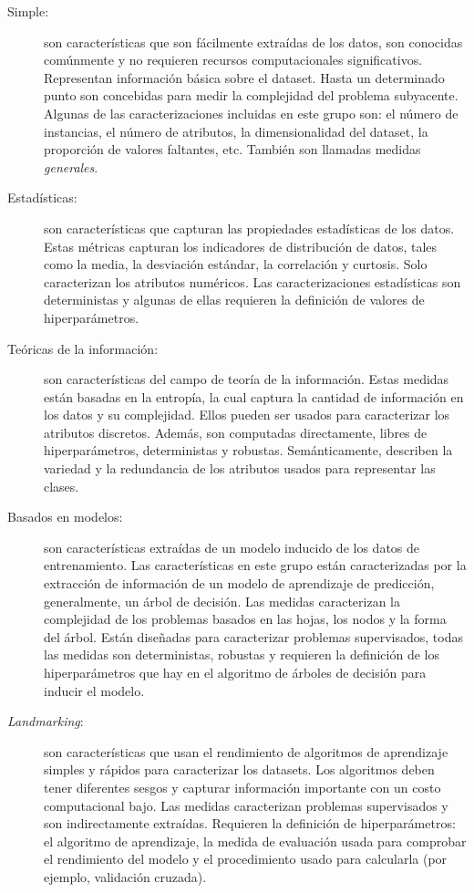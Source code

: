 \begin{description}
	\item[Simple:] son características que son fácilmente extraídas de los datos, son conocidas comúnmente y no requieren recursos computacionales significativos. Representan información básica sobre el dataset. Hasta un determinado punto son concebidas para medir la complejidad del problema subyacente. Algunas de las caracterizaciones incluidas en este grupo son: el número de instancias, el número de atributos, la dimensionalidad del dataset, la proporción de valores faltantes, etc. También son llamadas medidas \textit{generales}.
	
	\item[Estadísticas:] son características que capturan las propiedades estadísticas de los datos. Estas métricas capturan los indicadores de distribución de datos, tales como la media, la desviación estándar, la correlación y curtosis. Solo caracterizan los atributos numéricos. Las caracterizaciones estadísticas son deterministas y algunas de ellas requieren la definición de valores de hiperparámetros. %
	
	\item[Teóricas de la información:] son características del campo de teoría de la información. Estas medidas están basadas en la entropía, la cual captura la cantidad de información en los datos y su complejidad. Ellos pueden ser usados para caracterizar los atributos discretos. Además, son computadas directamente, libres de hiperparámetros, deterministas y robustas. Semánticamente, describen la variedad y la redundancia de los atributos usados para representar las clases.
	
	\item[Basados en modelos:] son características extraídas de un modelo inducido de los datos de entrenamiento. Las características en este grupo están caracterizadas por la extracción de información de un modelo de aprendizaje de predicción, generalmente, un árbol de decisión. Las medidas caracterizan la complejidad de los problemas basados en las hojas, los nodos y la forma del árbol. Están diseñadas para caracterizar problemas supervisados, todas las medidas son deterministas, robustas y requieren la definición de los hiperparámetros que hay en el algoritmo de árboles de decisión para inducir el modelo.
	
	\item[\textit{Landmarking}:] son características que usan el rendimiento de algoritmos de aprendizaje simples y rápidos para caracterizar los datasets. Los algoritmos deben tener diferentes sesgos y capturar información importante con un costo computacional bajo. Las medidas caracterizan problemas supervisados y son indirectamente extraídas. Requieren la definición de hiperparámetros: el algoritmo de aprendizaje, la medida de evaluación usada para comprobar el rendimiento del modelo y el procedimiento usado para calcularla (por ejemplo, validación cruzada).
\end{description}

